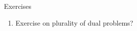 \begin{xcb}{Exercises}
\begin{enumerate}[label=\thechapter.\arabic*]




\item Exercise on plurality of dual problems?

\end{enumerate}
\end{xcb}